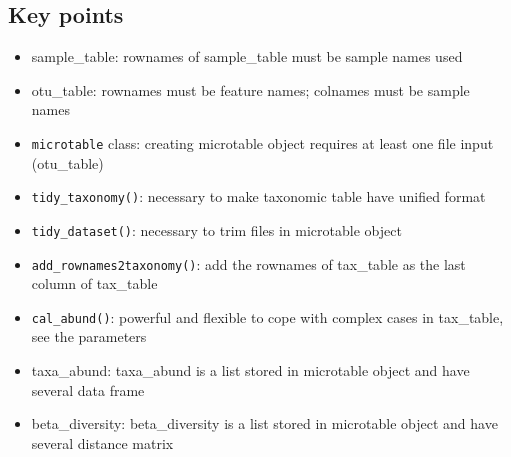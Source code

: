 \documentclass[
]{book}
\newenvironment{Shaded}{\begin{snugshade}}{\end{snugshade}}
\newcommand{\AttributeTok}[1]{\textcolor[rgb]{0.77,0.63,0.00}{#1}}
\newcommand{\CommentTok}[1]{\textcolor[rgb]{0.56,0.35,0.01}{\textit{#1}}}
\newcommand{\DecValTok}[1]{\textcolor[rgb]{0.00,0.00,0.81}{#1}}
\newcommand{\FunctionTok}[1]{\textcolor[rgb]{0.00,0.00,0.00}{#1}}
\newcommand{\NormalTok}[1]{#1}
\newcommand{\OtherTok}[1]{\textcolor[rgb]{0.56,0.35,0.01}{#1}}
\newcommand{\SpecialCharTok}[1]{\textcolor[rgb]{0.00,0.00,0.00}{#1}}
\newcommand{\StringTok}[1]{\textcolor[rgb]{0.31,0.60,0.02}{#1}}
\providecommand{\tightlist}{%
  \setlength{\itemsep}{0pt}\setlength{\parskip}{0pt}}
\begin{document}
\begin{Shaded}
\end{Shaded}

\hypertarget{key-points}{%
\subsection{Key points}\label{key-points}}

\begin{itemize}
\tightlist
\item
  sample\_table: rownames of sample\_table must be sample names used
\item
  otu\_table: rownames must be feature names; colnames must be sample names
\item
  \texttt{microtable} class: creating microtable object requires at least one file input (otu\_table)
\item
  \texttt{tidy\_taxonomy()}: necessary to make taxonomic table have unified format
\item
  \texttt{tidy\_dataset()}: necessary to trim files in microtable object
\item
  \texttt{add\_rownames2taxonomy()}: add the rownames of tax\_table as the last column of tax\_table
\item
  \texttt{cal\_abund()}: powerful and flexible to cope with complex cases in tax\_table, see the parameters
\item
  taxa\_abund: taxa\_abund is a list stored in microtable object and have several data frame
\item
  beta\_diversity: beta\_diversity is a list stored in microtable object and have several distance matrix
\end{itemize}
\end{document}
